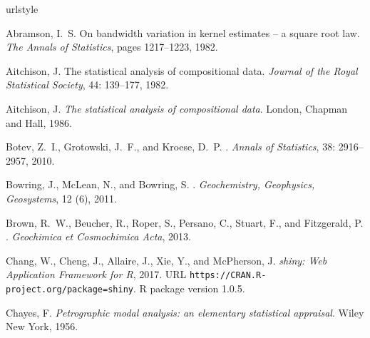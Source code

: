 \documentclass{article}
\begin{document}
\begin{thebibliography}{78}
\providecommand{\natexlab}[1]{#1}
\providecommand{\url}[1]{\texttt{#1}}
\expandafter\ifx\csname urlstyle\endcsname\relax
  \providecommand{\doi}[1]{doi: #1}\else
  \providecommand{\doi}{doi: \begingroup \urlstyle{rm}\Url}\fi

Abramson, I.~S.
\newblock On bandwidth variation in kernel estimates -- a square root law.
\newblock \emph{The Annals of Statistics}, pages 1217--1223, 1982.

Aitchison, J.
\newblock The statistical analysis of compositional data.
\newblock \emph{Journal of the Royal Statistical Society}, 44:
  139--177, 1982.

Aitchison, J.
\newblock \emph{The statistical analysis of compositional data}.
\newblock London, Chapman and Hall, 1986.

{Botev}, Z.~I., {Grotowski}, J.~F., and {Kroese}, D.~P.
.
\newblock \emph{Annals of Statistics}, 38: 2916--2957, 2010.

Bowring, J., McLean, N., and Bowring, S.
.
\newblock \emph{Geochemistry, Geophysics, Geosystems}, 12 (6), 2011.

Brown, R.~W., Beucher, R., Roper, S., Persano, C., Stuart, F., and Fitzgerald,
  P.
.
\newblock \emph{Geochimica et Cosmochimica Acta}, 2013.

Chang, W., Cheng, J., Allaire, J., Xie, Y., and McPherson, J.
\newblock \emph{{shiny: Web Application Framework for R}}, 2017.
\newblock URL \url{https://CRAN.R-project.org/package=shiny}.
\newblock R package version 1.0.5.

Chayes, F.
\newblock \emph{Petrographic modal analysis: an elementary statistical
  appraisal}.
\newblock Wiley New York, 1956.


\end{thebibliography}
\end{document}
